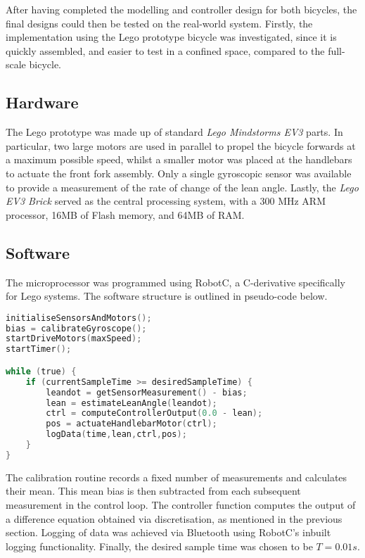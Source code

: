 After having completed the modelling and controller design for both bicycles, the final designs could then be tested on the real-world system. Firstly, the implementation using the Lego prototype bicycle was investigated, since it is quickly assembled, and easier to test in a confined space, compared to the full-scale bicycle.

\subsection{Hardware}
The Lego prototype was made up of standard \textit{Lego Mindstorms EV3} parts. In particular, two large motors are used in parallel to propel the bicycle forwards at a maximum possible speed, whilst a smaller motor was placed at the handlebars to actuate the front fork assembly. Only a single gyroscopic sensor was available to provide a measurement of the rate of change of the lean angle. Lastly, the \textit{Lego EV3 Brick} served as the central processing system, with a 300 MHz ARM processor, 16MB of Flash memory, and 64MB of RAM.

\subsection{Software} \label{legosoftwaresec}
The microprocessor was programmed using RobotC, a C-derivative specifically for Lego systems. The software structure is outlined in pseudo-code below.

\begin{lstlisting}[language=C, caption=Lego Software Pseudo-Code]
initialiseSensorsAndMotors();
bias = calibrateGyroscope();
startDriveMotors(maxSpeed);
startTimer();

while (true) {
	if (currentSampleTime >= desiredSampleTime) {
		leandot = getSensorMeasurement() - bias;
		lean = estimateLeanAngle(leandot);
		ctrl = computeControllerOutput(0.0 - lean);
		pos = actuateHandlebarMotor(ctrl);
		logData(time,lean,ctrl,pos);
	}
}
\end{lstlisting}

The calibration routine records a fixed number of measurements and calculates their mean. This mean bias is then subtracted from each subsequent measurement in the control loop. The controller function computes the output of a difference equation obtained via discretisation, as mentioned in the previous section. Logging of data was achieved via Bluetooth using RobotC's inbuilt logging functionality. Finally, the desired sample time was chosen to be $T=0.01s$.

